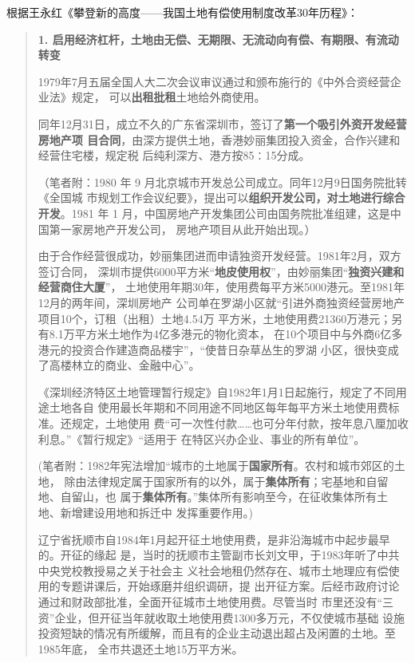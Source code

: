 根据王永红《攀登新的高度——我国土地有偿使用制度改革30年历程》：
\begin{quotation}
  \textbf{1. 启用经济杠杆，土地由无偿、无期限、无流动向有偿、有期限、有流动转变}

  1979年7月五届全国人大二次会议审议通过和颁布施行的《中外合资经营企业法》规定，
  可以\textbf{出租批租}土地给外商使用。

  同年12月31日，成立不久的广东省深圳市，签订了\textbf{第一个吸引外资开发经营房地产项
    目合同}，由深方提供土地，香港妙丽集团投入资金，合作兴建和经营住宅楼，规定税
  后纯利深方、港方按85∶15分成。

  （笔者附：1980 年 9 月北京城市开发总公司成立。同年12月9日国务院批转《全国城
  市规划工作会议纪要》，提出可以\textbf{组织开发公司，对土地进行综合开发}。1981 年 1
  月，中国房地产开发集团公司由国务院批准组建，这是中国第一家房地产开发公司，
  房地产项目从此开始出现。）

  由于合作经营很成功，妙丽集团进而申请独资开发经营。1981年2月，双方签订合同，
  深圳市提供6000平方米“\textbf{地皮使用权}”，由妙丽集团“\textbf{独资兴建和经营商住大厦}”，
  土地使用年期30年，使用费每平方米5000港元。至1981年12月的两年间，深圳房地产
  公司单在罗湖小区就“引进外商独资经营房地产项目10个，订租（出租）土地4.54万
  平方米，土地使用费21360万港元；另有8.1万平方米土地作为4亿多港元的物化资本，
  在10个项目中与外商6亿多港元的投资合作建造商品楼宇”，“使昔日杂草丛生的罗湖
  小区，很快变成了高楼林立的商业、金融中心”。

  《深圳经济特区土地管理暂行规定》自1982年1月1日起施行，规定了不同用途土地各自
  使用最长年期和不同用途不同地区每年每平方米土地使用费标准。还规定，土地使用
  费“可一次性付款……也可分年付款，按年息八厘加收利息。”《暂行规定》“适用于
  在特区兴办企业、事业的所有单位”。

  (笔者附：1982年宪法增加“城市的土地属于\textbf{国家所有}。农村和城市郊区的土地，
  除由法律规定属于国家所有的以外，属于\textbf{集体所有}；宅基地和自留地、自留山，也
  属于\textbf{集体所有}。”集体所有影响至今，在征收集体所有土地、新增建设用地和拆迁中
  发挥重要作用。)

  辽宁省抚顺市自1984年1月起开征土地使用费，是非沿海城市中起步最早的。开征的缘起
  是，当时的抚顺市主管副市长刘文甲，于1983年听了中共中央党校教授易之关于社会主
  义社会地租仍然存在、城市土地理应有偿使用的专题讲课后，开始琢磨并组织调研，提
  出开征方案。后经市政府讨论通过和财政部批准，全面开征城市土地使用费。尽管当时
  市里还没有“三资”企业，但开征当年就收取土地使用费1300多万元，不仅使城市基础
  设施投资短缺的情况有所缓解，而且有的企业主动退出超占及闲置的土地。至1985年底，
  全市共退还土地15万平方米。


\end{quotation}
